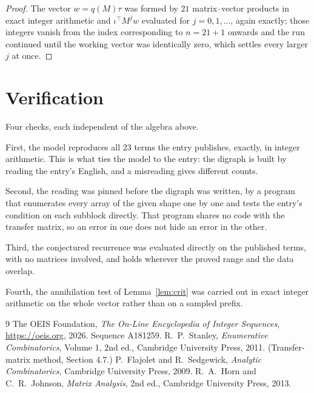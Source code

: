 \documentclass[11pt,a4paper]{article}
\theoremstyle{plain}
\theoremstyle{definition}
\begin{document}
\begin{proof}
The vector $w=q(M)\tau$ was formed by $21$ matrix--vector products in exact integer
arithmetic and $\iota^{\!\top}M^{j}w$ evaluated for $j=0,1,\dots$, again exactly; those
integers vanish from the index corresponding to $n=21+1$ onwards and the run continued
until the working vector was identically zero, which settles every larger $j$ at once.
\end{proof}

\section{Verification}

Four checks, each independent of the algebra above.

First, the model reproduces all $23$ terms the entry publishes, exactly, in integer
arithmetic. This is what ties the model to the entry: the digraph is built by reading the
entry's English, and a misreading gives different counts.

Second, the reading was pinned before the digraph was written, by a program that enumerates
every array of the given shape one by one and tests the entry's condition on each subblock
directly. That program shares no code with the transfer matrix, so an error in one does not
hide an error in the other.

Third, the conjectured recurrence was evaluated directly on the published terms, with no
matrices involved, and holds wherever the proved range and the data overlap.

Fourth, the annihilation test of Lemma~\ref{lem:crit} was carried out in exact integer
arithmetic on the whole vector rather than on a sampled prefix.

\begin{thebibliography}{9}
 The OEIS Foundation, \emph{The On-Line Encyclopedia of Integer
Sequences}, \url{https://oeis.org}, 2026. Sequence A181259.
 R.~P.~Stanley, \emph{Enumerative Combinatorics}, Volume 1, 2nd ed.,
Cambridge University Press, 2011. (Transfer-matrix method, Section 4.7.)
 P.~Flajolet and R.~Sedgewick, \emph{Analytic Combinatorics}, Cambridge
University Press, 2009.
 R.~A.~Horn and C.~R.~Johnson, \emph{Matrix Analysis}, 2nd ed., Cambridge
University Press, 2013.
\end{thebibliography}
\end{document}

